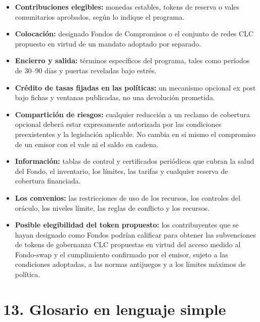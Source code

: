 \documentclass[11pt]{article}
\begin{document}
\begin{itemize}[leftmargin=*]
\item \textbf{Contribuciones elegibles:} monedas estables, tokens de reserva o vales comunitarios aprobados, según lo indique el programa.
\item \textbf{Colocación:} designado Fondos de Compromisos o el conjunto de redes CLC propuesto en virtud de un mandato adoptado por separado.
\item \textbf{Encierro y salida:} términos específicos del programa, tales como períodos de 30--90 días y puertas reveladas bajo estrés.
\item \textbf{Crédito de tasas fijadas en las políticas:} un mecanismo opcional ex post bajo fichas y ventanas publicadas, no una devolución prometida.
\item \textbf{Compartición de riesgos:} cualquier reducción a un reclamo de cobertura opcional deberá estar expresamente autorizada por las condiciones preexistentes y la legislación aplicable. No cambia en sí mismo el compromiso de un emisor con el vale ni el saldo en cadena.
\item \textbf{Información:} tablas de control y certificados periódicos que cubran la salud del Fondo, el inventario, los límites, las tarifas y cualquier reserva de cobertura financiada.
\item \textbf{Los convenios:} las restricciones de uso de los recursos, los controles del oráculo, los niveles límite, las reglas de conflicto y los recursos.
\item \textbf{Posible elegibilidad del token propuesto:} los contribuyentes que se hayan designado como Fondos podrían calificar para obtener las subvenciones de tokens de gobernanza CLC propuestas en virtud del acceso medido al Fondo-swap y el cumplimiento confirmado por el emisor, sujeto a las condiciones adoptadas, a las normas antijuegos y a los límites máximos de política.
\end{itemize}


\section*{13. Glosario en lenguaje simple}
\end{document}
